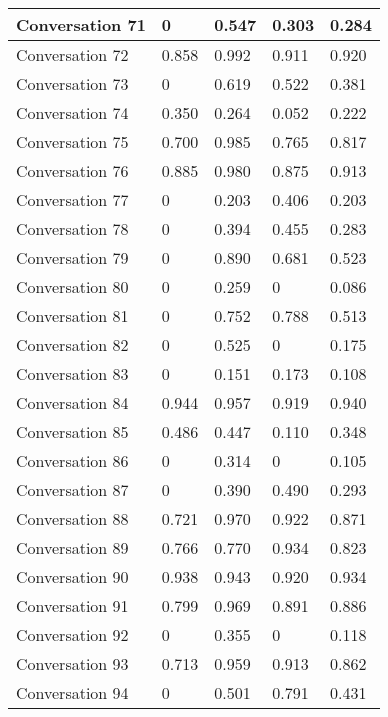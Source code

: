 \begin{table}[]
\begin{tabular}{|l|l|l|l|l|}
Conversation 71  & 0        & 0.547 & 0.303       & 0.284   \\ \hline
Conversation 72  & 0.858    & 0.992 & 0.911       & 0.920   \\ \hline
Conversation 73  & 0        & 0.619 & 0.522       & 0.381   \\ \hline
Conversation 74  & 0.350    & 0.264 & 0.052       & 0.222   \\ \hline
Conversation 75  & 0.700    & 0.985 & 0.765       & 0.817   \\ \hline
Conversation 76  & 0.885    & 0.980 & 0.875       & 0.913   \\ \hline
Conversation 77  & 0        & 0.203 & 0.406       & 0.203   \\ \hline
Conversation 78  & 0        & 0.394 & 0.455       & 0.283   \\ \hline
Conversation 79  & 0        & 0.890 & 0.681       & 0.523   \\ \hline
Conversation 80  & 0        & 0.259 & 0           & 0.086   \\ \hline
Conversation 81  & 0        & 0.752 & 0.788       & 0.513   \\ \hline
Conversation 82  & 0        & 0.525 & 0           & 0.175   \\ \hline
Conversation 83  & 0        & 0.151 & 0.173       & 0.108   \\ \hline
Conversation 84  & 0.944    & 0.957 & 0.919       & 0.940   \\ \hline
Conversation 85  & 0.486    & 0.447 & 0.110       & 0.348   \\ \hline
Conversation 86  & 0        & 0.314 & 0           & 0.105   \\ \hline
Conversation 87  & 0        & 0.390 & 0.490       & 0.293   \\ \hline
Conversation 88  & 0.721    & 0.970 & 0.922       & 0.871   \\ \hline
Conversation 89  & 0.766    & 0.770 & 0.934       & 0.823   \\ \hline
Conversation 90  & 0.938    & 0.943 & 0.920       & 0.934   \\ \hline
Conversation 91  & 0.799    & 0.969 & 0.891       & 0.886   \\ \hline
Conversation 92  & 0        & 0.355 & 0           & 0.118   \\ \hline
Conversation 93  & 0.713    & 0.959 & 0.913       & 0.862   \\ \hline
Conversation 94  & 0        & 0.501 & 0.791       & 0.431   \\ \hline

\end{tabular}
\end{table}

